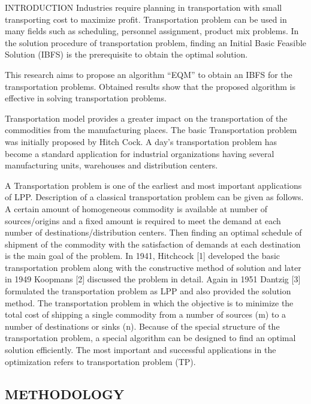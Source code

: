 \documentclass{article}
\begin{document}
INTRODUCTION
Industries require planning in transportation with small transporting cost to maximize profit. Transportation problem can be used in many fields such as scheduling, personnel assignment, product mix problems. In the solution procedure of transportation problem, finding an Initial Basic Feasible Solution (IBFS) is the prerequisite to obtain the optimal solution.

This research aims to propose an algorithm
“EQM” to obtain an IBFS for the transportation problems. Obtained results show that the proposed algorithm is effective in solving transportation problems.

Transportation model provides a greater impact on the
transportation of the commodities from the manufacturing places. The basic Transportation problem was initially
proposed by Hitch Cock. A day’s transportation problem has become a standard application for industrial organizations having several manufacturing units, warehouses and distribution centers.

A Transportation problem is one of the
earliest and most important applications of
LPP. Description of a classical
transportation problem can be given as
follows. A certain amount of homogeneous
commodity is available at number of
sources/origins and a fixed amount is
required to meet the demand at each number
of destinations/distribution centers. Then
finding an optimal schedule of shipment of
the commodity with the satisfaction of demands at each destination is the main goal
of the problem. In 1941, Hitchcock [1]
developed the basic transportation problem
along with the constructive method of
solution and later in 1949 Koopmans [2]
discussed the problem in detail. Again in
1951 Dantzig [3] formulated the
transportation problem as LPP and also
provided the solution method. The
transportation problem in which the
objective is to minimize the total cost of
shipping a single commodity from a number
of sources (m) to a number of destinations or
sinks (n). Because of the special structure of
the transportation problem, a special
algorithm can be designed to find an optimal
solution efficiently. The most important and
successful applications in the optimization
refers to transportation problem (TP).


\newpage

\begin{center}
	\section{METHODOLOGY}
\end{center}
\end{document}
